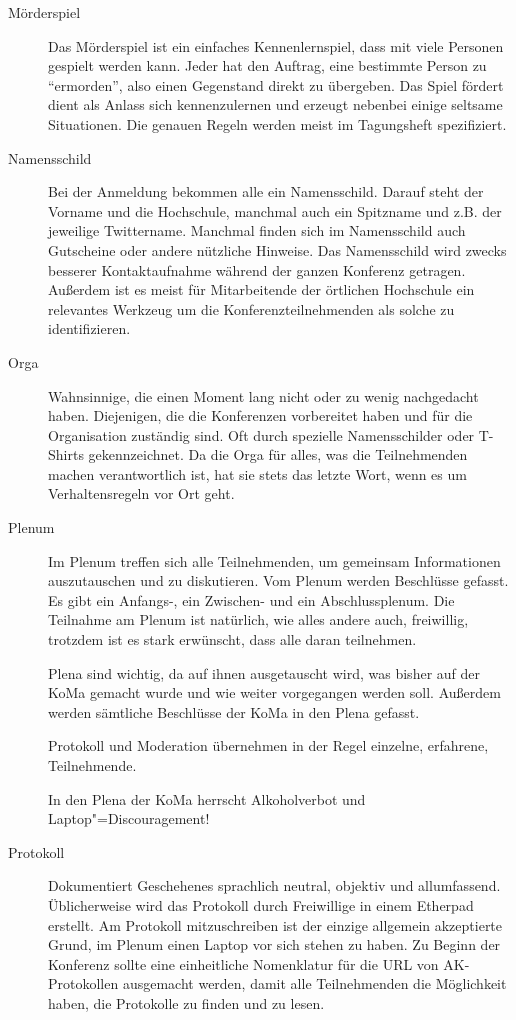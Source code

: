 \begin{description}
\item[Mörderspiel]
    Das Mörderspiel ist ein einfaches Kennenlernspiel, dass mit viele Personen gespielt werden kann. Jeder hat den Auftrag, eine bestimmte Person zu \enquote{ermorden}, also einen Gegenstand direkt zu übergeben.
    Das Spiel fördert dient als Anlass sich kennenzulernen und erzeugt nebenbei einige seltsame Situationen.
    Die genauen Regeln werden meist im Tagungsheft spezifiziert.
    
\item[Namensschild]
    Bei der Anmeldung bekommen alle ein	Namensschild. Darauf steht der Vorname und die Hochschule, manchmal auch ein Spitzname und z.B. der jeweilige Twittername. Manchmal finden sich im Namensschild auch Gutscheine oder andere nützliche Hinweise. Das Namensschild wird zwecks besserer Kontaktaufnahme während der ganzen Konferenz getragen. Außerdem ist es meist für Mitarbeitende der örtlichen Hochschule ein relevantes Werkzeug um die Konferenzteilnehmenden als solche zu identifizieren.

\item[Orga]
    Wahnsinnige, die einen Moment lang nicht oder zu wenig nachgedacht haben. Diejenigen, die die Konferenzen vorbereitet haben und für die Organisation zuständig sind. Oft durch spezielle Namensschilder oder T-Shirts gekennzeichnet.
    Da die Orga für alles, was die Teilnehmenden machen verantwortlich ist, hat sie stets das letzte Wort, wenn es um Verhaltensregeln vor Ort geht.

\item[Plenum]
    Im Plenum treffen sich alle Teilnehmenden, um gemeinsam Informationen auszutauschen und zu diskutieren. Vom Plenum werden Beschlüsse gefasst. Es gibt ein Anfangs-, ein Zwischen- und ein Abschlussplenum. Die Teilnahme am Plenum ist natürlich, wie alles andere auch, freiwillig, trotzdem ist es stark erwünscht, dass alle daran teilnehmen.
    
    Plena sind wichtig, da auf ihnen ausgetauscht wird, was bisher auf der KoMa gemacht wurde und wie weiter vorgegangen werden soll. Außerdem werden sämtliche Beschlüsse der KoMa in den Plena gefasst.
    
	Protokoll und Moderation übernehmen in der Regel einzelne, erfahrene, Teilnehmende.
    
    In den Plena der KoMa herrscht Alkoholverbot und Laptop"=Discouragement!

\item[Protokoll]
    Dokumentiert Geschehenes sprachlich neutral, objektiv und allumfassend. Üblicherweise wird das Protokoll durch Freiwillige in einem Etherpad erstellt. Am Protokoll mitzuschreiben ist der einzige allgemein akzeptierte Grund, im Plenum einen Laptop vor sich stehen zu haben.
	Zu Beginn der Konferenz sollte eine einheitliche Nomenklatur für die URL von AK-Protokollen ausgemacht werden, damit alle Teilnehmenden die Möglichkeit haben, die Protokolle zu finden und zu lesen.


\end{description}
